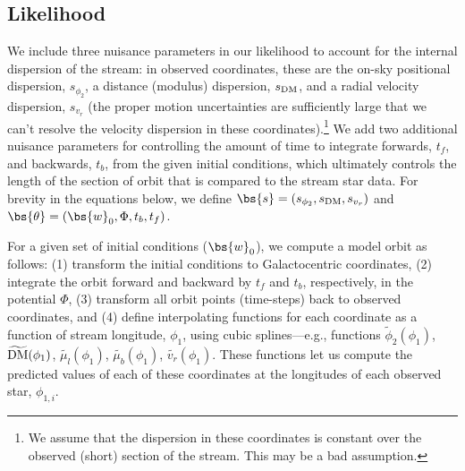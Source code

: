 \documentclass[letterpaper,12pt,preprint]{aastex}
\newcommand{\DM}{{\rm DM}}
\begin{document}
\subsection{Likelihood}

We include three nuisance parameters in our likelihood to account for the internal dispersion of the stream: in observed coordinates, these are the on-sky positional dispersion, $s_{\phi_2}$, a distance (modulus) dispersion, $s_{\DM}$, and a radial velocity dispersion, $s_{v_r}$ (the proper motion uncertainties are sufficiently large that we can't resolve the velocity dispersion in these coordinates).\footnote{We assume that the dispersion in these coordinates is constant over the observed (short) section of the stream. This may be a bad assumption.} We add two additional nuisance parameters for controlling the amount of time to integrate forwards, $t_f$, and backwards, $t_b$, from the given initial conditions, which ultimately controls the length of the section of orbit that is compared to the stream star data. For brevity in the equations below, we define $\bs{s} = (s_{\phi_2}, s_{\DM}, s_{v_r})$ and $\bs{\theta} = (\bs{w}_0, \Phi, t_b, t_f)$.

For a given set of initial conditions ($\bs{w}_0$), we compute a model orbit as follows: (1) transform the initial conditions to Galactocentric coordinates, (2) integrate the orbit forward and backward by $t_f$ and $t_b$, respectively, in the potential $\Phi$, (3) transform all orbit points (time-steps) back to observed coordinates, and (4) define interpolating functions for each coordinate as a function of stream longitude, $\phi_1$, using cubic splines---e.g., functions $\widetilde{\phi}_{2}(\phi_1)$, $\widetilde{\DM}(\phi_1)$, $\widetilde{\mu_l}(\phi_1)$, $\widetilde{\mu_b}(\phi_1)$, $\widetilde{v_r}(\phi_1)$. These functions let us compute the predicted values of each of these coordinates at the longitudes of each observed star, $\phi_{1,i}$.
\end{document}
